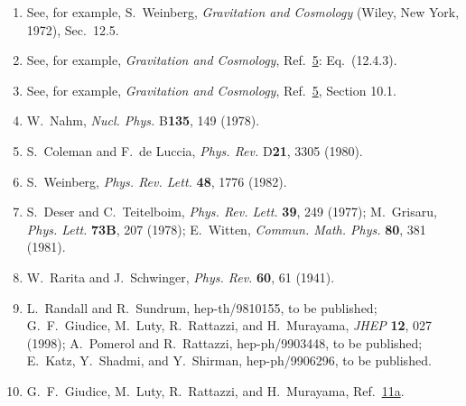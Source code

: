 \begin{enumerate}
  \item {}\label{ch31-ref-5}
  See, for example, S.~Weinberg, \textit{Gravitation and Cosmology}
  (Wiley, New York, 1972), Sec.~12.5.

  \item {}\label{ch31-ref-6}
  See, for example, \textit{Gravitation and Cosmology},
  Ref.~\hyperref[ch31-ref-5]{5}: Eq.~(12.4.3).

  \item {}\label{ch31-ref-7}
  See, for example, \textit{Gravitation and Cosmology},
  Ref.~\hyperref[ch31-ref-5]{5}, Section 10.1.

  \item[7a.] \label{ch31-ref-7a}
  W.~Nahm, \textit{Nucl. Phys.} B\textbf{135}, 149 (1978).

  \item {}\label{ch31-ref-8}
  S.~Coleman and F.~de Luccia, \textit{Phys. Rev.} D\textbf{21}, 3305
  (1980).

  \item {}\label{ch31-ref-9}
  S.~Weinberg, \textit{Phys. Rev. Lett.} \textbf{48}, 1776 (1982).

  \item {}\label{ch31-ref-10}
  S.~Deser and C.~Teitelboim, \textit{Phys. Rev. Lett.} \textbf{39},
  249 (1977); M.~Grisaru, \textit{Phys. Lett.} \textbf{73B}, 207
  (1978); E.~Witten, \textit{Commun. Math. Phys.} \textbf{80}, 381
  (1981).

  \item {}\label{ch31-ref-11}
  W.~Rarita and J.~Schwinger, \textit{Phys. Rev.} \textbf{60}, 61
  (1941).

  \item[11a.] \label{ch31-ref-11a}
  L.~Randall and R.~Sundrum, hep-th/9810155, to be published;
  G.~F.~Giudice, M.~Luty, R.~Rattazzi, and H.~Murayama,
  \textit{JHEP} \textbf{12}, 027 (1998); A.~Pomerol and R.~Rattazzi,
  hep-ph/9903448, to be published; E.~Katz, Y.~Shadmi, and Y.~Shirman,
  hep-ph/9906296, to be published.

  \item[11b.] \label{ch31-ref-11b}
  G.~F.~Giudice, M.~Luty, R.~Rattazzi, and H.~Murayama,
  Ref.~\hyperref[ch31-ref-11a]{11a}.


\end{enumerate}
